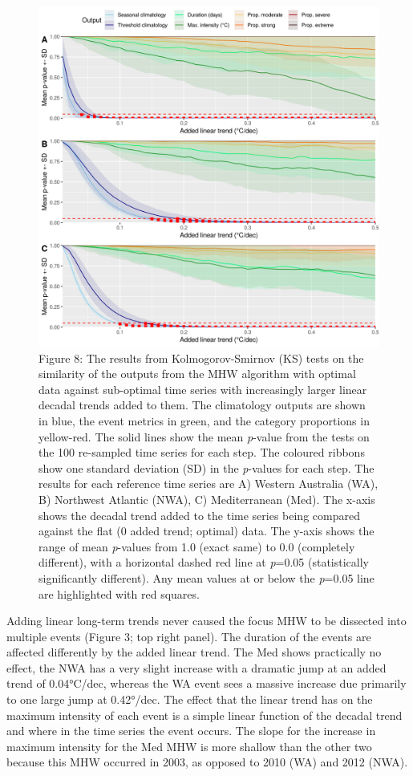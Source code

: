 \documentclass[]{article}
\begin{document}
\begin{figure}
\centering
\includegraphics{../LaTeX/fig_8.png}
\caption{Figure 8: The results from Kolmogorov-Smirnov (KS) tests on the
similarity of the outputs from the MHW algorithm with optimal data
against sub-optimal time series with increasingly larger linear decadal
trends added to them. The climatology outputs are shown in blue, the
event metrics in green, and the category proportions in yellow-red. The
solid lines show the mean \emph{p}-value from the tests on the 100
re-sampled time series for each step. The coloured ribbons show one
standard deviation (SD) in the \emph{p}-values for each step. The
results for each reference time series are A) Western Australia (WA), B)
Northwest Atlantic (NWA), C) Mediterranean (Med). The x-axis shows the
decadal trend added to the time series being compared against the flat
(0 added trend; optimal) data. The y-axis shows the range of mean
\emph{p}-values from 1.0 (exact same) to 0.0 (completely different),
with a horizontal dashed red line at \emph{p}=0.05 (statistically
significantly different). Any mean values at or below the \emph{p}=0.05
line are highlighted with red squares.}
\end{figure}

Adding linear long-term trends never caused the focus MHW to be
dissected into multiple events (Figure 3; top right panel). The duration
of the events are affected differently by the added linear trend. The
Med shows practically no effect, the NWA has a very slight increase with
a dramatic jump at an added trend of 0.04°C/dec, whereas the WA event
sees a massive increase due primarily to one large jump at 0.42°/dec.
The effect that the linear trend has on the maximum intensity of each
event is a simple linear function of the decadal trend and where in the
time series the event occurs. The slope for the increase in maximum
intensity for the Med MHW is more shallow than the other two because
this MHW occurred in 2003, as opposed to 2010 (WA) and 2012 (NWA).
\end{document}
